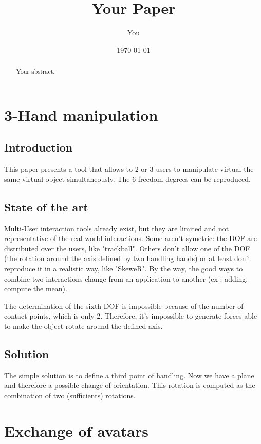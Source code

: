 \documentclass[a4paper]{article}
\title{Your Paper}
\author{You}
\date{\today}
\begin{document}
\maketitle

\begin{abstract}
Your abstract.
\end{abstract}

\section{3-Hand manipulation}

\subsection{Introduction}

This paper presents a tool that allows to 2 or 3 users to manipulate virtual the same virtual object simultaneously. The 6 freedom degrees can be reproduced.

\subsection{State of the art}

Multi-User interaction tools already exist, but they are limited and not representative of the real world interactions. Some aren't symetric: the DOF are distributed over the users, like "trackball". Others don't allow one of the DOF (the rotation around the axis defined by two handling hands) or at least don't reproduce it in a realistic way, like "SkeweR". By the way, the good ways to combine two interactions change from an application to another (ex : adding, compute the mean).

The determination of the sixth DOF is impossible because of the number of contact points, which is only 2. Therefore, it's impossible to generate forces able to make the object rotate around the defined axis.

\subsection{Solution}

The simple solution is to define a third point of handling. Now we have a plane and therefore a possible change of orientation. This rotation is computed as the combination of two (sufficients) rotations.

\section{Exchange of avatars}
\end{document}
